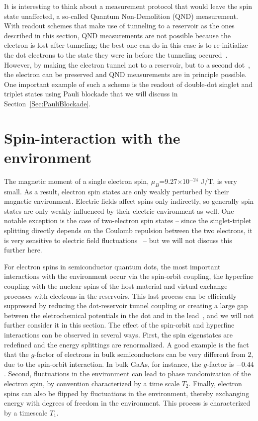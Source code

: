 \documentclass[rmp,twocolumn,aps]{revtex4}
\begin{document}
It is interesting to think about a measurement protocol that would leave the spin state unaffected, a so-called Quantum Non-Demolition (QND) measurement. With readout schemes that make use of tunneling to a reservoir as the ones described in this section, QND measurements are not possible because the electron is lost after tunneling; the best one can do in this case is to re-initialize the dot electrons to the state they were in before the tunneling occured~\cite{Meunier06}. However, by making the electron tunnel not to a reservoir, but to a second dot~\cite{EngelPRL2004,EngelScience05}, the electron can be preserved and QND measurements are in principle possible. One important example of such a scheme is the readout of double-dot singlet and triplet states using Pauli blockade that we will discuss in Section~\ref{Sec:PauliBlockade}.


\section{Spin-interaction with the environment}
\label{Spinenvironment}

The magnetic moment of a single electron spin,
$\mu_B$=9.27$\times$10$^{-24}$ J/T, is very small. As a result,
electron spin states are only weakly perturbed by their magnetic
environment. Electric fields affect spins only indirectly, so generally spin states are only weakly influenced by their electric environment as well. One notable exception is the case of two-electron spin states -- since the singlet-triplet splitting directly depends on the Coulomb repulsion between the two electrons, it is very sensitive to electric field fluctuations~\cite{Hu06} -- but we will not discuss this further here.

For electron spins in semiconductor quantum dots, the most important interactions with the environment occur via the spin-orbit coupling, the hyperfine coupling with the nuclear spins of the host material and virtual exchange processes with electrons
in the reservoirs. This last process can be efficiently suppressed by
reducing the dot-reservoir tunnel coupling or creating a large gap between the eletrochemical potentials in the dot and in the lead~\cite{FujisawaNature2002}, and we will not
further consider it in this section. The effect of the spin-orbit
and hyperfine interactions can be observed in several ways. First,
the spin eigenstates are redefined and the energy splittings are
renormalized. A good example is the fact that the $g$-factor of
electrons in bulk semiconductors can be very different from $2$,
due to the spin-orbit interaction. In bulk GaAs, for instance, the
$g$-factor is $-0.44$. Second, fluctuations in the environment can
lead to phase randomization of the electron spin, by convention
characterized by a time scale $T_2$. Finally, electron spins can
also be flipped by fluctuations in the environment, thereby
exchanging energy with degrees of freedom in the environment. This
process is characterized by a timescale $T_1$.
\end{document}
